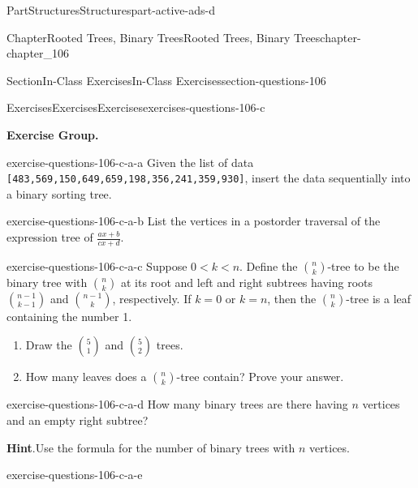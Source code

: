 \documentclass[oneside,10pt,]{book}
\newcommand{\blocktitlefont}{\relax}
\newcommand{\mono}[1]{\texttt{#1}}
\numberwithin{equation}{section}
\newcommand{\lt}{<}
\begin{document}
\begin{partptx}{Part}{Structures}{}{Structures}{}{}{part-active-ads-d}
\begin{chapterptx}{Chapter}{Rooted Trees, Binary Trees}{}{Rooted Trees, Binary Trees}{}{}{chapter-chapter_106}
\begin{sectionptx}{Section}{In-Class Exercises}{}{In-Class Exercises}{}{}{section-questions-106}
%
%
\typeout{************************************************}
\typeout{************************************************}
%
\begin{exercises-subsection-numberless}{Exercises}{Exercises}{}{Exercises}{}{}{exercises-questions-106-c}
\par\medskip\noindent%
\textbf{Exercise Group.}\space\space%
\begin{exercisegroup}
\begin{divisionexerciseeg}{1}{}{}{exercise-questions-106-c-a-a}%
Given the list of data \mono{[483,569,150,649,659,198,356,241,359,930]}, insert the data sequentially into a binary sorting tree.%
\end{divisionexerciseeg}%
\begin{divisionexerciseeg}{2}{}{}{exercise-questions-106-c-a-b}%
List the vertices in a postorder traversal of the  expression tree of \(\frac{a x + b}{c x + d}\).%
\end{divisionexerciseeg}%
\begin{divisionexerciseeg}{3}{}{}{exercise-questions-106-c-a-c}%
Suppose \(0 \lt k \lt n\). Define the \(\binom{n}{k}\)-tree to be the binary tree with \(\binom{n}{k}\) at its root and left and right subtrees having roots \(\binom{n-1}{k-1}\) and \(\binom{n-1}{k}\), respectively. If \(k=0\) or \(k=n\), then the \(\binom{n}{k}\)-tree is a leaf containing the number 1.%
\begin{enumerate}[label=(\alph*)]
\item{}Draw the \(\binom{5}{1}\) and \(\binom{5}{2}\) trees.%
\item{}How many leaves does a \(\binom{n}{k}\)-tree contain?  Prove your answer.%
\end{enumerate}
%
\end{divisionexerciseeg}%
\begin{divisionexerciseeg}{4}{}{}{exercise-questions-106-c-a-d}%
How many binary trees are there having \(n\) vertices and an empty right subtree?%
\par\smallskip%
\noindent\textbf{\blocktitlefont Hint}.\hypertarget{hint-questions-106-c-a-d-b}{}\quad{}Use the formula for the number of binary trees with \(n\) vertices.%
\end{divisionexerciseeg}%
\begin{divisionexerciseeg}{5}{}{}{exercise-questions-106-c-a-e}%
\begin{sidebyside}{2}{0}{0}{0}%
\begin{sbspanel}{0.5}%

\end{sbspanel}
\end{sidebyside}
\end{divisionexerciseeg}
\end{exercisegroup}
\end{exercises-subsection-numberless}
\end{sectionptx}
\end{chapterptx}
\end{partptx}
\end{document}

